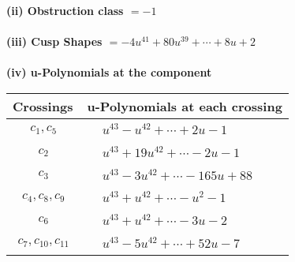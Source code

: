 \documentclass[1p]{elsarticle_modified}
\theoremstyle{definition}
\begin{document}
\flushleft \textbf{(ii) Obstruction class $= -1$}\\~\\
\flushleft \textbf{(iii) Cusp Shapes $= -4 u^{41}+80 u^{39}+\cdots+8 u+2$}\\~\\
\newpage\renewcommand{\arraystretch}{1}
\flushleft \textbf{(iv) u-Polynomials at the component}\newline \\
\begin{tabular}{m{50pt}|m{274pt}}
Crossings & \hspace{64pt}u-Polynomials at each crossing \\
\hline $$\begin{aligned}c_{1},c_{5}\end{aligned}$$&$\begin{aligned}
&u^{43}- u^{42}+\cdots+2 u-1
\end{aligned}$\\
\hline $$\begin{aligned}c_{2}\end{aligned}$$&$\begin{aligned}
&u^{43}+19 u^{42}+\cdots-2 u-1
\end{aligned}$\\
\hline $$\begin{aligned}c_{3}\end{aligned}$$&$\begin{aligned}
&u^{43}-3 u^{42}+\cdots-165 u+88
\end{aligned}$\\
\hline $$\begin{aligned}c_{4},c_{8},c_{9}\end{aligned}$$&$\begin{aligned}
&u^{43}+u^{42}+\cdots- u^2-1
\end{aligned}$\\
\hline $$\begin{aligned}c_{6}\end{aligned}$$&$\begin{aligned}
&u^{43}+u^{42}+\cdots-3 u-2
\end{aligned}$\\
\hline $$\begin{aligned}c_{7},c_{10},c_{11}\end{aligned}$$&$\begin{aligned}
&u^{43}-5 u^{42}+\cdots+52 u-7
\end{aligned}$\\
\hline
\end{tabular}\\~\\
\end{document}
